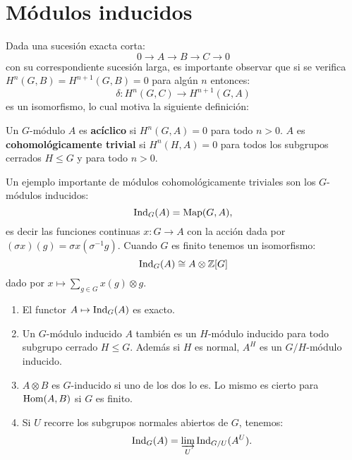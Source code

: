 \documentclass[a4paper,12pt, leqno]{article}
\begin{document}
\section{Módulos inducidos}
Dada una sucesión exacta corta:
\begin{equation*}
0 \rightarrow A \rightarrow B \rightarrow C \rightarrow 0
\end{equation*}
con su correspondiente sucesión larga, es importante observar que si se verifica $H^n(G,B)=H^{n+1}(G,B)=0$ para algún $n$ entonces:
\begin{equation*}
\delta: H^n(G,C)\rightarrow H^{n+1}(G,A)
\end{equation*}
es un isomorfismo, lo cual motiva la siguiente definición:
\begin{definicion}
	Un $G$-módulo $A$ es \textbf{acíclico} si $H^n(G,A)=0$ para todo $n>0$. $A$ es \textbf{cohomológicamente trivial} si $H^n(H,A)=0$ para todos los subgrupos cerrados $H\leq G$ y para todo $n>0$.
\end{definicion}
Un ejemplo importante de módulos cohomológicamente triviales son los $G$-módulos inducidos:
\begin{equation*}
\mathrm{Ind}_G(A)=\mathrm{Map}(G,A),
\end{equation*}
es decir las funciones continuas $x: G \rightarrow A$ con la acción dada por $(\sigma x)(g)=\sigma x(\sigma^{-1} g)$. Cuando $G$ es finito tenemos un isomorfismo:
\begin{equation*}
\mathrm{Ind}_G (A) \cong A \otimes \mathbb{Z}[G]
\end{equation*}
dado por $x \mapsto \sum_{g \in G}x(g) \otimes g$.
\begin{prop}
	\begin{enumerate}[label=\roman*)]
		\item El functor $A \mapsto \mathrm{Ind}_G (A)$ es exacto. 
		\item Un $G$-módulo inducido $A$ también es un $H$-módulo inducido para todo subgrupo cerrado $H\leq G$. Además si $H$ es normal, $A^H$ es un $G/H$-módulo inducido.
		\item $A \otimes B$ es $G$-inducido si uno de los dos lo es. Lo mismo es cierto para $\mathrm{Hom}(A,B)$ si $G$ es finito. 
		\item Si $U$ recorre los subgrupos normales abiertos de $G$, tenemos:
		\begin{equation*} 
		\mathrm{Ind}_G (A)= \varinjlim\limits_U \mathrm{Ind}_{G/U}(A^U).
		\end{equation*}
	\end{enumerate}
\end{prop}
\end{document}
